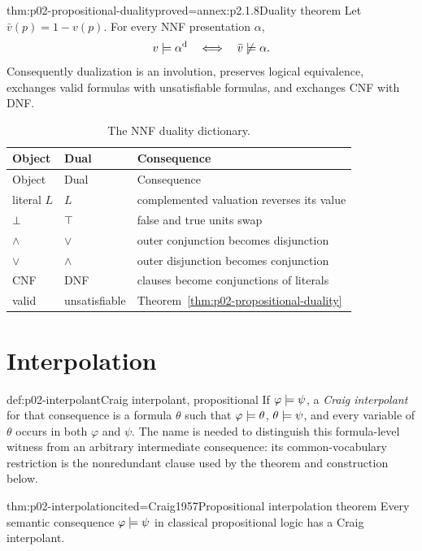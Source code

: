 \begin{hbtheorem}{thm:p02-propositional-duality}{proved=annex:p2.1.8}{Duality theorem}
Let \(\bar v(p)=1-v(p)\).  For every NNF presentation \(\alpha\),
\[
 v\models\alpha^{\mathrm d}\quad\Longleftrightarrow\quad
 \bar v\not\models\alpha.
\]
Consequently dualization is an involution, preserves logical equivalence,
exchanges valid formulas with unsatisfiable formulas, and exchanges CNF with
DNF.
\end{hbtheorem}

\begingroup\small
\begin{longtable}{@{}lll@{}}
\caption{The NNF duality dictionary.}
\label{tab:p02-duality}\\
\toprule Object & Dual & Consequence \\
\midrule\endfirsthead
\toprule Object & Dual & Consequence \\
\midrule\endhead
literal \(L\) & \(L\) & complemented valuation reverses its value \\
\(\bot\) & \(\top\) & false and true units swap \\
\(\land\) & \(\lor\) & outer conjunction becomes disjunction \\
\(\lor\) & \(\land\) & outer disjunction becomes conjunction \\
CNF & DNF & clauses become conjunctions of literals \\
valid & unsatisfiable & Theorem~\ref{thm:p02-propositional-duality} \\
\bottomrule
\end{longtable}
\endgroup

\section{Interpolation}
\label{sec:p02-prop-interpolation}

\begin{hbdefinition}{def:p02-interpolant}{Craig interpolant, propositional}
If \(\varphi\models\psi\), a \emph{Craig interpolant} for that consequence
is a formula \(\theta\) such that
\(\varphi\models\theta\), \(\theta\models\psi\), and every variable of
\(\theta\) occurs in both \(\varphi\) and \(\psi\).  The name is needed to
distinguish this formula-level witness from an arbitrary intermediate
consequence: its common-vocabulary restriction is the nonredundant clause used
by the theorem and construction below.
\end{hbdefinition}

\begin{hbtheorem}{thm:p02-interpolation}{cited=Craig1957}{Propositional interpolation theorem}
Every semantic consequence \(\varphi\models\psi\) in classical
propositional logic has a Craig interpolant.
\end{hbtheorem}

